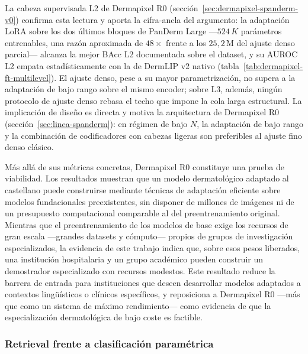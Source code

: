 La cabeza supervisada L2 de Dermapixel R0
(sección~\ref{sec:dermapixel-spanderm-v0}) confirma esta lectura y
aporta la cifra-ancla del argumento: la adaptación LoRA sobre los dos
últimos bloques de PanDerm Large ---$524\,K$ parámetros entrenables,
una razón aproximada de $48\times$ frente a los $25{,}2$\,M del ajuste
denso parcial--- alcanza la mejor BAcc L2 documentada sobre el
dataset, y su AUROC L2 empata estadísticamente con la de DermLIP v2
nativo (tabla~\ref{tab:dermapixel-ft-multilevel}). El ajuste denso,
pese a su mayor parametrización, no supera a la adaptación de bajo
rango sobre el mismo encoder; sobre L3, además, ningún protocolo de
ajuste denso rebasa el techo que impone la cola larga estructural. La
implicación de diseño es directa y motiva la arquitectura de
Dermapixel R0 (sección~\ref{sec:linea-spanderm}): en régimen de bajo
$N$, la adaptación de bajo rango y la combinación de codificadores con
cabezas ligeras son preferibles al ajuste fino denso clásico.

Más allá de sus métricas concretas, Dermapixel R0 constituye una
prueba de viabilidad. Los resultados muestran que un modelo
dermatológico adaptado al castellano puede construirse mediante
técnicas de adaptación eficiente sobre modelos fundacionales
preexistentes, sin disponer de millones de imágenes ni de un
presupuesto computacional comparable al del preentrenamiento original.
Mientras que el preentrenamiento de los modelos de base exige los
recursos de gran escala ---grandes datasets y cómputo--- propios de
grupos de investigación especializados, la evidencia de este trabajo
indica que, sobre esos pesos liberados, una institución hospitalaria y
un grupo académico pueden construir un demostrador especializado con
recursos modestos. Este resultado reduce la barrera de entrada para
instituciones que deseen desarrollar modelos adaptados a contextos
lingüísticos o clínicos específicos, y reposiciona a Dermapixel R0
---más que como un sistema de máximo rendimiento--- como evidencia de
que la especialización dermatológica de bajo coste es factible.

\subsubsection{Retrieval frente a clasificación paramétrica}
\label{sec:disc-retrieval}

